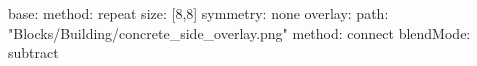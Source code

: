 base:
  method: repeat
  size: [8,8]
  symmetry: none
overlay:
  path: "Blocks/Building/concrete_side_overlay.png"
  method: connect
blendMode: subtract